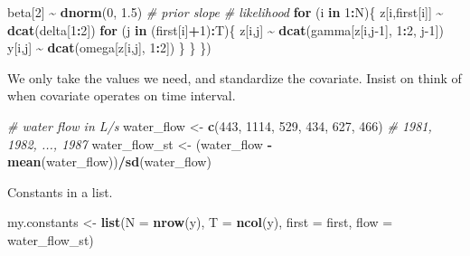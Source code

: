 \documentclass[
  12pt,
]{krantz}
\newenvironment{Shaded}{\begin{snugshade}}{\end{snugshade}}
\newcommand{\AttributeTok}[1]{\textcolor[rgb]{0.13,0.29,0.53}{#1}}
\newcommand{\CommentTok}[1]{\textcolor[rgb]{0.56,0.35,0.01}{\textit{#1}}}
\newcommand{\ControlFlowTok}[1]{\textcolor[rgb]{0.13,0.29,0.53}{\textbf{#1}}}
\newcommand{\DecValTok}[1]{\textcolor[rgb]{0.00,0.00,0.81}{#1}}
\newcommand{\FloatTok}[1]{\textcolor[rgb]{0.00,0.00,0.81}{#1}}
\newcommand{\FunctionTok}[1]{\textcolor[rgb]{0.13,0.29,0.53}{\textbf{#1}}}
\newcommand{\NormalTok}[1]{#1}
\newcommand{\OtherTok}[1]{\textcolor[rgb]{0.56,0.35,0.01}{#1}}
\newcommand{\SpecialCharTok}[1]{\textcolor[rgb]{0.81,0.36,0.00}{\textbf{#1}}}
\begin{document}
\begin{Shaded}
\begin{Highlighting}[]
\NormalTok{  beta[}\DecValTok{2}\NormalTok{] }\SpecialCharTok{\textasciitilde{}} \FunctionTok{dnorm}\NormalTok{(}\DecValTok{0}\NormalTok{, }\FloatTok{1.5}\NormalTok{) }\CommentTok{\# prior slope}
  \CommentTok{\# likelihood}
  \ControlFlowTok{for}\NormalTok{ (i }\ControlFlowTok{in} \DecValTok{1}\SpecialCharTok{:}\NormalTok{N)\{}
\NormalTok{    z[i,first[i]] }\SpecialCharTok{\textasciitilde{}} \FunctionTok{dcat}\NormalTok{(delta[}\DecValTok{1}\SpecialCharTok{:}\DecValTok{2}\NormalTok{])}
    \ControlFlowTok{for}\NormalTok{ (j }\ControlFlowTok{in}\NormalTok{ (first[i]}\SpecialCharTok{+}\DecValTok{1}\NormalTok{)}\SpecialCharTok{:}\NormalTok{T)\{}
\NormalTok{      z[i,j] }\SpecialCharTok{\textasciitilde{}} \FunctionTok{dcat}\NormalTok{(gamma[z[i,j}\DecValTok{{-}1}\NormalTok{], }\DecValTok{1}\SpecialCharTok{:}\DecValTok{2}\NormalTok{, j}\DecValTok{{-}1}\NormalTok{])}
\NormalTok{      y[i,j] }\SpecialCharTok{\textasciitilde{}} \FunctionTok{dcat}\NormalTok{(omega[z[i,j], }\DecValTok{1}\SpecialCharTok{:}\DecValTok{2}\NormalTok{])}
\NormalTok{    \}}
\NormalTok{  \}}
\NormalTok{\})}
\end{Highlighting}
\end{Shaded}

We only take the values we need, and standardize the covariate. Insist on think of when covariate operates on time interval.

\begin{Shaded}
\begin{Highlighting}[]
\CommentTok{\# water flow in L/s}
\NormalTok{water\_flow }\OtherTok{\textless{}{-}} \FunctionTok{c}\NormalTok{(}\DecValTok{443}\NormalTok{, }\DecValTok{1114}\NormalTok{, }\DecValTok{529}\NormalTok{, }\DecValTok{434}\NormalTok{, }\DecValTok{627}\NormalTok{, }\DecValTok{466}\NormalTok{) }\CommentTok{\# 1981, 1982, ..., 1987}
\NormalTok{water\_flow\_st }\OtherTok{\textless{}{-}}\NormalTok{ (water\_flow }\SpecialCharTok{{-}} \FunctionTok{mean}\NormalTok{(water\_flow))}\SpecialCharTok{/}\FunctionTok{sd}\NormalTok{(water\_flow)}
\end{Highlighting}
\end{Shaded}

Constants in a list.

\begin{Shaded}
\begin{Highlighting}[]
\NormalTok{my.constants }\OtherTok{\textless{}{-}} \FunctionTok{list}\NormalTok{(}\AttributeTok{N =} \FunctionTok{nrow}\NormalTok{(y),}
                     \AttributeTok{T =} \FunctionTok{ncol}\NormalTok{(y),}
                     \AttributeTok{first =}\NormalTok{ first,}
                     \AttributeTok{flow =}\NormalTok{ water\_flow\_st)}
\end{Highlighting}
\end{Shaded}
\end{document}
